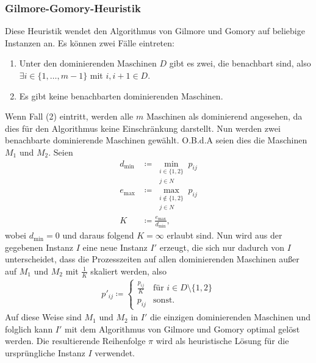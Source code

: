 \documentclass{scrreprt}
\begin{document}
\subsubsection{Gilmore-Gomory-Heuristik}
\label{subsubsec:ggHeuristik}
Diese Heuristik wendet den Algorithmus von Gilmore und Gomory auf beliebige Instanzen an.
Es können zwei Fälle eintreten:
\begin{enumerate}
    \item Unter den dominierenden Maschinen $D$ gibt es zwei, die benachbart sind, also $\exists i\in\{1,\ldots,m-1\}$ mit $i,i+1\in D$.
    \item Es gibt keine benachbarten dominierenden Maschinen.
\end{enumerate}
Wenn Fall (2) eintritt, werden alle $m$ Maschinen als dominierend angesehen, da dies für den Algorithmus keine Einschränkung darstellt.
Nun werden zwei benachbarte dominierende Maschinen gewählt.
O.B.d.A seien dies die Maschinen $M_1$ und $M_2$. Seien 
\begin{align} 
    d_{\min} &\coloneqq \min_{\substack{i\in \{1,2\} \\ j\in N}} p_{ij} \\
    e_{\max} &\coloneqq \max_{\substack{i\not\in \{1,2\} \\ j\in N}} p_{ij} \\
    K &\coloneqq \frac{e_{\max}}{d_{\min}} \text{,}
\end{align}
wobei $d_{\min}=0$ und daraus folgend $K=\infty$ erlaubt sind. 
Nun wird aus der gegebenen Instanz $I$ eine neue Instanz $I'$ erzeugt, die sich nur dadurch von $I$ unterscheidet, dass die Prozesszeiten
auf allen dominierenden Maschinen außer auf $M_1$ und $M_2$ mit $\frac{1}{K}$ skaliert werden, also
\begin{align}
    p'_{ij} \coloneqq \begin{cases} \frac{p_{ij}}{K} &\text{für } i\in D\setminus\{1,2\} \\ p_{ij} &\text{sonst.} \end{cases}
\end{align}
Auf diese Weise sind $M_1$ und $M_2$ in $I'$ die einzigen dominierenden Maschinen und folglich kann $I'$ mit dem Algorithmus von Gilmore und Gomory optimal gelöst werden.
Die resultierende Reihenfolge $\pi$ wird als heuristische Lösung für die ursprüngliche Instanz $I$ verwendet.
\end{document}
